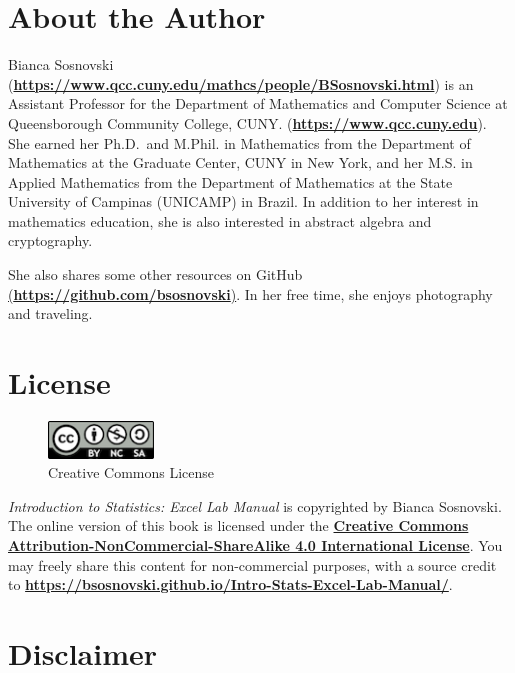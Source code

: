 \documentclass[
]{book}
\begin{document}
\hypertarget{about-the-author}{%
\section*{About the Author}\label{about-the-author}}

Bianca Sosnovski (\textbf{\url{https://www.qcc.cuny.edu/mathcs/people/BSosnovski.html}}) is an Assistant Professor for the Department of Mathematics and Computer Science at Queensborough Community College, CUNY. (\textbf{\url{https://www.qcc.cuny.edu}}). She earned her Ph.D.~and M.Phil. in Mathematics from the Department of Mathematics at the Graduate Center, CUNY in New York, and her M.S. in Applied Mathematics from the Department of Mathematics at the State University of Campinas (UNICAMP) in Brazil. In addition to her interest in mathematics education, she is also interested in abstract algebra and cryptography.

She also shares some other resources on GitHub \href{https://github.com/bsosnovski}{(\textbf{https://github.com/bsosnovski})}. In her free time, she enjoys photography and traveling.

\hypertarget{license}{%
\section*{License}\label{license}}

\begin{figure}
\centering
\includegraphics[width=0.25\textwidth,height=\textheight]{images/CC-BY-NC-SA.png}
\caption{Creative Commons License}
\end{figure}

\emph{Introduction to Statistics: Excel Lab Manual} is copyrighted by Bianca Sosnovski. The online version of this book is licensed under the \href{http://creativecommons.org/licenses/by-nc-sa/4.0/}{\textbf{Creative Commons Attribution-NonCommercial-ShareAlike 4.0 International License}}. You may freely share this content for non-commercial purposes, with a source credit to \href{https://bsosnovski.github.io/Intro-Stats-Excel-Lab-Manual/}{\textbf{https://bsosnovski.github.io/Intro-Stats-Excel-Lab-Manual/}}.

\hypertarget{disclaimer}{%
\section*{Disclaimer}\label{disclaimer}}
\end{document}
